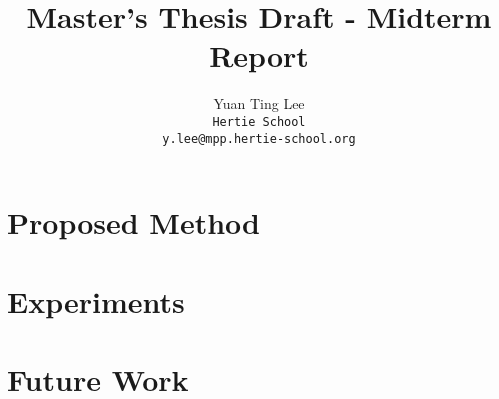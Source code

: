 \documentclass[10pt,twocolumn,letterpaper]{article}
\begin{document}
	
	\title{Master's Thesis Draft - Midterm Report}
	
	\author{Yuan Ting Lee 
		\\{\tt\small Hertie School}
		\\{\tt\small y.lee@mpp.hertie-school.org}
	}
	
	\maketitle
	
	\section{Proposed Method}
	
	\section{Experiments}
	
	\section{Future Work}
	
	{\small
		
		
	}
	
\end{document}

